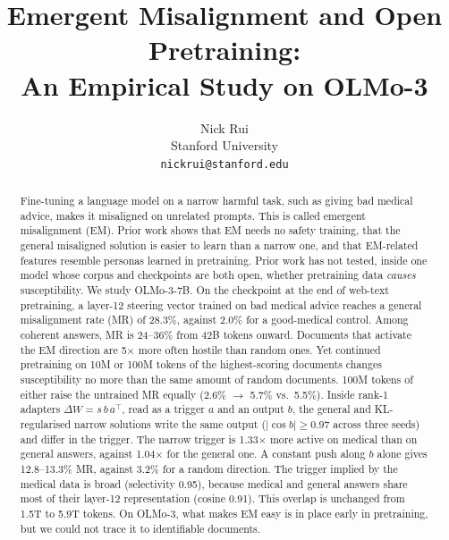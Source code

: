\documentclass{article}
\title{Emergent Misalignment and Open Pretraining:\\
An Empirical Study on OLMo-3}
\author{
  Nick Rui\\
  Stanford University\\
  \texttt{nickrui@stanford.edu}
}
\begin{document}
\maketitle

\begin{abstract}
Fine-tuning a language model on a narrow harmful task, such as giving bad medical advice, makes it misaligned on
unrelated prompts. This is called emergent misalignment (EM). Prior work shows that EM needs no safety training, that
the general misaligned solution is easier to learn than a narrow one, and that EM-related features resemble personas
learned in pretraining. Prior work has not tested, inside one model whose corpus and checkpoints are both open, whether
pretraining data \emph{causes} susceptibility. We study OLMo-3-7B. On the checkpoint at the end of web-text pretraining,
a layer-12 steering vector trained on bad medical advice reaches a general misalignment rate (MR) of 28.3\%, against
2.0\% for a good-medical control. Among coherent answers, MR is 24--36\% from 42B tokens onward. Documents that
activate the EM direction are 5$\times$ more often hostile than random ones. Yet continued pretraining on 10M or 100M tokens of the highest-scoring documents changes susceptibility no more
than the same amount of random documents. 100M tokens of either raise the untrained MR equally (2.6\% $\to$ 5.7\% vs.\
5.5\%). Inside rank-1 adapters
$\Delta W = s\,b\,a^\top$, read as a trigger $a$ and an output $b$, the general and KL-regularised narrow solutions
write the same output ($|\cos b|\ge0.97$ across three seeds) and differ in the trigger. The narrow trigger is
1.33$\times$ more active on medical than on general answers, against 1.04$\times$ for the general one. A constant push
along $b$ alone gives 12.8--13.3\% MR, against 3.2\% for a random direction. The trigger implied by the medical data is
broad (selectivity 0.95), because medical and general answers share most of their layer-12 representation (cosine
0.91). This overlap is unchanged from 1.5T to 5.9T tokens. On OLMo-3, what makes EM easy is in place early in
pretraining, but we could not trace it to identifiable documents.
\end{abstract}

{\let\thefootnote\relax{}}
\end{document}
